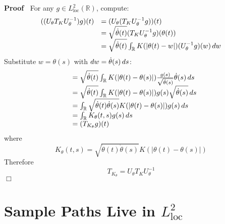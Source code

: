\documentclass{article}
\newcommand{\tmop}[1]{\ensuremath{\operatorname{#1}}}
\newenvironment{proof}{\noindent\textbf{Proof\ }}{\hspace*{\fill}$\Box$\medskip}
\begin{document}
\begin{proof}
  For any $g \in L^2_{\tmop{loc}} (\mathbb{R})$, compute:
  \begin{equation}
    \begin{array}{ll}
      ((U_{\theta} T_K U_{\theta}^{- 1}) g) (t) & = (U_{\theta} (T_K
      U_{\theta}^{- 1} g)) (t)\\
      & = \sqrt{\dot{\theta} (t)}  (T_K U_{\theta}^{- 1} g) (\theta (t))\\
      & = \sqrt{\dot{\theta} (t)}  \int_{\mathbb{R}} K (| \theta (t) - w|) 
      (U_{\theta}^{- 1} g) (w)  \hspace{0.17em} dw
    \end{array}
  \end{equation}
  Substitute $w = \theta (s)$ with $dw = \dot{\theta} (s)  \hspace{0.17em}
  ds$:
  \begin{equation}
    \begin{array}{ll}
      & = \sqrt{\dot{\theta} (t)}  \int_{\mathbb{R}} K (| \theta (t) - \theta
      (s) |) \frac{g (s)}{\sqrt{\dot{\theta} (s)}}  \dot{\theta} (s) 
      \hspace{0.17em} ds\\
      & = \sqrt{\dot{\theta} (t)}  \int_{\mathbb{R}} K (| \theta (t) - \theta
      (s) |) g (s) \sqrt{\dot{\theta} (s)}  \hspace{0.17em} ds\\
      & = \int_{\mathbb{R}} \sqrt{\dot{\theta} (t) \dot{\theta} (s)} K (|
      \theta (t) - \theta (s) |) g (s)  \hspace{0.17em} ds\\
      & = \int_{\mathbb{R}} K_{\theta} (t, s) g (s)  \hspace{0.17em} ds\\
      & = (T_{K_{\theta}} g) (t)
    \end{array}
  \end{equation}
  where
  \begin{equation}
    K_{\theta} (t, s) = \sqrt{\dot{\theta} (t) \dot{\theta} (s)} K (| \theta
    (t) - \theta (s) |)
  \end{equation}
  Therefore
  \begin{equation}
    T_{K_{\theta}} = U_{\theta} T_K U_{\theta}^{- 1}
  \end{equation}
\end{proof}

\section{Sample Paths Live in $L^2_{\tmop{loc}}$}\label{sec:samplepaths}
\end{document}
